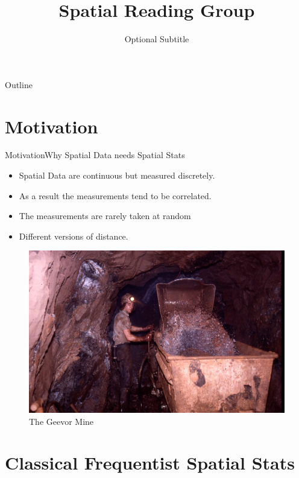 \documentclass{beamer}
\title{Spatial Reading Group}
\subtitle{Optional Subtitle}
\begin{document}
\begin{frame}
  \titlepage
\end{frame}

\begin{frame}{Outline}
  \tableofcontents
\end{frame}

\section{Motivation}


\begin{frame}{Motivation}{Why Spatial Data needs Spatial Stats}
  \begin{itemize}
  	\item {
   		Spatial Data are continuous but measured discretely.
 	}
    \item {
 		As a result the measurements tend to be correlated.
 	}
 	\item {
  		The measurements are rarely taken at random
  	}
    \item{
    	Different versions of distance.
    }
	\end{itemize}
	\begin{figure}
	\centering
		\includegraphics[scale = 0.8]{Images/Geevor_Tin.jpg}
		\caption{ { \scriptsize The Geevor Mine}}
	\end{figure}    
\end{frame}


\section{Classical Frequentist Spatial Stats}
\end{document}
